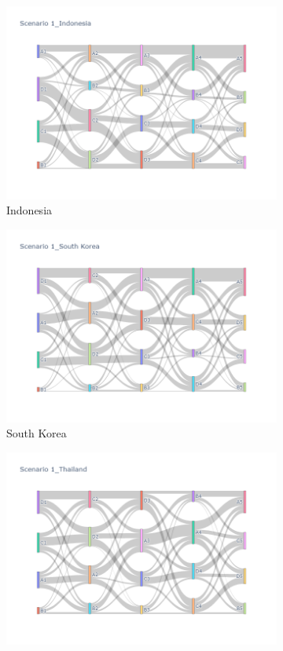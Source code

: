 \begin{figure}[h]
  \begin{subfigure}{0.5\textwidth}
    \centering
    \includegraphics[width=\textwidth]{Figure/figure32a.png}
    \caption{Indonesia}
  \end{subfigure}
  \begin{subfigure}{0.5\textwidth}
    \centering
    \includegraphics[width=\linewidth]{Figure/figure33a.png}
    \caption{South Korea}
  \end{subfigure}
  \begin{subfigure}{0.5\textwidth}
    \centering
    \includegraphics[width=\linewidth]{Figure/figure34a.png}

\end{subfigure}
\end{figure}
